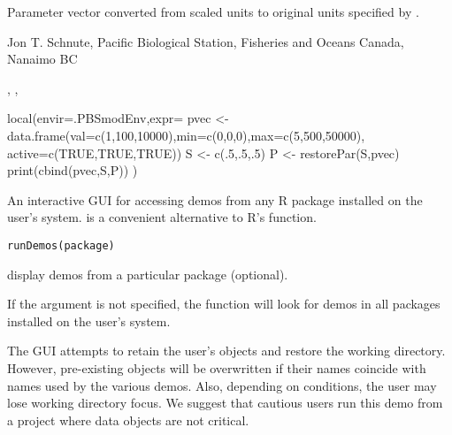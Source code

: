 \documentclass[letterpaper]{book}
\begin{document}
%
\begin{Value}
Parameter vector converted from scaled units to original units specified by .
\end{Value}
%
\begin{Author}\relax
Jon T. Schnute, Pacific Biological Station, Fisheries and Oceans Canada, Nanaimo BC
\end{Author}
%
\begin{SeeAlso}\relax
{}, , 
\end{SeeAlso}
%
\begin{Examples}
\begin{ExampleCode}
local(envir=.PBSmodEnv,expr={
  pvec <- data.frame(val=c(1,100,10000),min=c(0,0,0),max=c(5,500,50000),
    active=c(TRUE,TRUE,TRUE))
  S    <- c(.5,.5,.5)
  P    <- restorePar(S,pvec)
  print(cbind(pvec,S,P))
})
\end{ExampleCode}
\end{Examples}
%
\begin{Description}\relax
An interactive GUI for accessing demos from any R package installed on the 
user's system.  is a convenient alternative to R's  
function.
\end{Description}
%
\begin{Usage}
\begin{verbatim}
runDemos(package)
\end{verbatim}
\end{Usage}
%
\begin{Arguments}
\begin{ldescription}
\item[\code{package}]  display demos from a particular package (optional).
\end{ldescription}
\end{Arguments}
%
\begin{Details}\relax
If the argument  is not specified, the function will look for 
demos in all packages installed on the user's system.
\end{Details}
%
\begin{Note}\relax
The  GUI attempts to retain the user's objects and restore
the working directory. However, pre-existing objects will be overwritten 
if their names coincide with names used by the various demos. Also, 
depending on conditions, the user may lose working directory focus. 
We suggest that cautious users run this demo from a project where data objects are 
not critical.
\end{Note}
\end{document}
